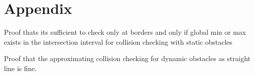 \chapter{Appendix}

Proof thats its sufficient to check only at borders and only if global min or max exists in the intersection interval for collision checking with static obstacles



Proof that the approximating collision checking for dynamic obstacles as straight line is fine. 

